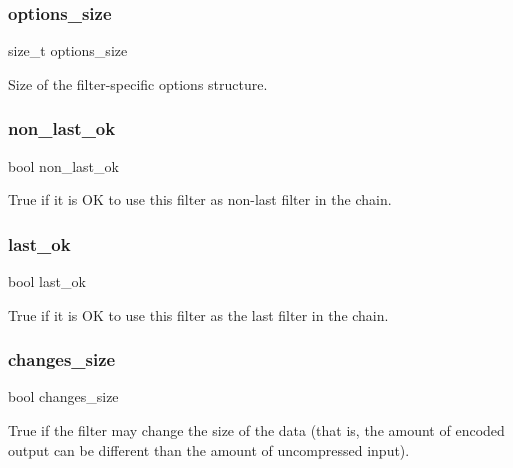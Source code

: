 \mbox{\label{filter__common_8c_ae3be9ce6129a435b24496c57bc8141a6}} 
\subsubsection{options\+\_\+size}
{\footnotesize\ttfamily size\+\_\+t options\+\_\+size}



Size of the filter-\/specific options structure. 

\mbox{\label{filter__common_8c_ad703ac63a7997112bb46bcb488bd83a5}} 
\subsubsection{non\+\_\+last\+\_\+ok}
{\footnotesize\ttfamily bool non\+\_\+last\+\_\+ok}

True if it is OK to use this filter as non-\/last filter in the chain. \mbox{\label{filter__common_8c_abccb55bd90f3f71fbeca1ca96f77fa40}} 
\subsubsection{last\+\_\+ok}
{\footnotesize\ttfamily bool last\+\_\+ok}

True if it is OK to use this filter as the last filter in the chain. \mbox{\label{filter__common_8c_ab49ba4b830db7487db6793b6bae9dc16}} 
\subsubsection{changes\+\_\+size}
{\footnotesize\ttfamily bool changes\+\_\+size}

True if the filter may change the size of the data (that is, the amount of encoded output can be different than the amount of uncompressed input). 